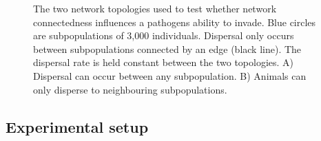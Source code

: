 \begin{figure}[t]
{\centering 
{}
}
\caption[Network topologies used to compare network connectedness]{
The two network topologies used to test whether network connectedness influences a pathogens ability to invade.
Blue circles are subpopulations of 3,000 individuals.
Dispersal only occurs between subpopulations connected by an edge (black line).
The dispersal rate is held constant between the two topologies.
A) Dispersal can occur between any subpopulation.
B) Animals can only disperse to neighbouring subpopulations. 
}
\label{f:net}
\end{figure}













\subsection{Experimental setup}

